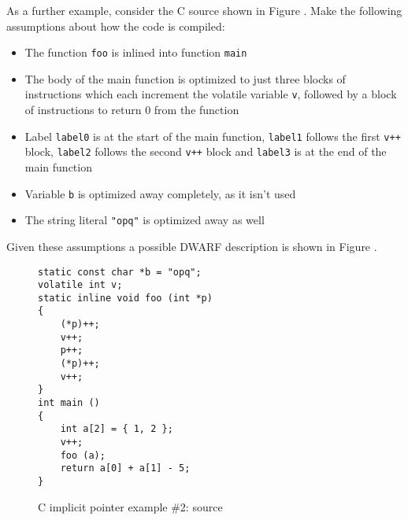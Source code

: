 As a further example, consider the C source 
shown in Figure . Make
the following assumptions about how the code is compiled:
\begin{itemize}
\item The function \texttt{foo} is inlined
into function \texttt{main}
\item The body of the main function is optimized to just
three blocks of instructions which each increment the volatile
variable \texttt{v}, followed by a block of instructions to return 0 from
the function
\item Label \texttt{label0} is at the start of the main
function, \texttt{label1} follows the first \texttt{v++} block, 
\texttt{label2} follows the second \texttt{v++} block and 
\texttt{label3} is at the end of the main function
\item Variable \texttt{b} is optimized away completely, as it isn't used
\item The string literal \texttt{"opq"} is optimized away as well
\end{itemize}
Given these assumptions a possible DWARF description is shown in
Figure .

\begin{figure}[h]
\begin{lstlisting}
static const char *b = "opq";
volatile int v;
static inline void foo (int *p)
{
    (*p)++;
    v++;
    p++;
    (*p)++;
    v++;
}
int main ()
{
    int a[2] = { 1, 2 };
    v++;
    foo (a);
    return a[0] + a[1] - 5;
}
\end{lstlisting}
\caption{C implicit pointer example \#2: source}
\label{fig:cimplicitpointerexample2source}
\end{figure}

